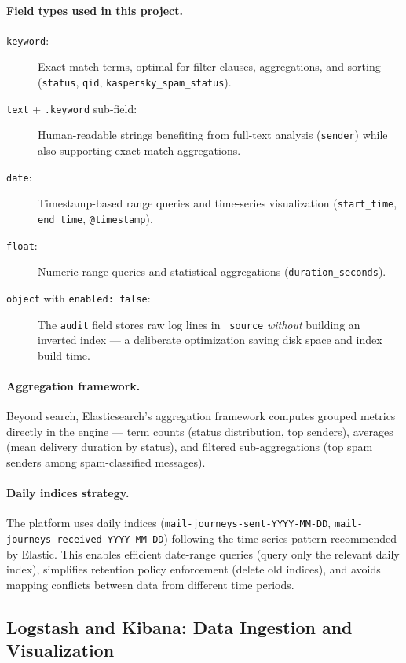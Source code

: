 \documentclass[12pt,a4paper,oneside]{report}
\begin{document}
\paragraph{Field types used in this project.}
\begin{description}
  \item[\texttt{keyword}:] Exact-match terms, optimal for filter clauses, aggregations, and sorting (\texttt{status}, \texttt{qid}, \texttt{kaspersky\_spam\_status}).
  \item[\texttt{text} + \texttt{.keyword} sub-field:] Human-readable strings benefiting from full-text analysis (\texttt{sender}) while also supporting exact-match aggregations.
  \item[\texttt{date}:] Timestamp-based range queries and time-series visualization (\texttt{start\_time}, \texttt{end\_time}, \texttt{@timestamp}).
  \item[\texttt{float}:] Numeric range queries and statistical aggregations (\texttt{duration\_seconds}).
  \item[\texttt{object} with \texttt{enabled: false}:] The \texttt{audit} field stores raw log lines in \texttt{\_source} \emph{without} building an inverted index --- a deliberate optimization saving disk space and index build time.
\end{description}

\paragraph{Aggregation framework.}
Beyond search, Elasticsearch's aggregation framework computes grouped metrics directly in the engine --- term counts (status distribution, top senders), averages (mean delivery duration by status), and filtered sub-aggregations (top spam senders among spam-classified messages).

\paragraph{Daily indices strategy.}
The platform uses daily indices (\texttt{mail-journeys-sent-YYYY-MM-DD}, \texttt{mail-journeys-received-YYYY-MM-DD}) following the time-series pattern recommended by Elastic.
This enables efficient date-range queries (query only the relevant daily index), simplifies retention policy enforcement (delete old indices), and avoids mapping conflicts between data from different time periods.

\subsection{Logstash and Kibana: Data Ingestion and Visualization}
\end{document}
